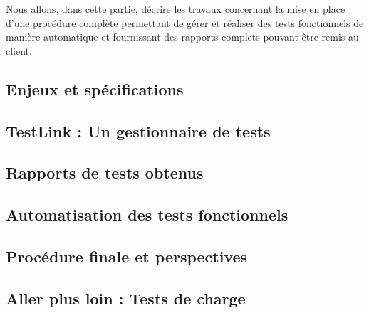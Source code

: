 	Nous allons, dans cette partie, décrire les travaux concernant la mise en place d'une procédure complète permettant de gérer et réaliser des tests fonctionnels de manière automatique et fournissant des rapports complets pouvant être remis au client.

\subsection{Enjeux et spécifications}
	
	\label{testsFonc_01}

\subsection{TestLink : Un gestionnaire de tests}
	
	\label{testsFonc_02}
	
\subsection{Rapports de tests obtenus}
	
	\label{testsFonc_03}

\subsection{Automatisation des tests fonctionnels}
	
	\label{testsFonc_04}
		
\subsection{Procédure finale et perspectives}
	
	\label{testsFonc_05}
	
\subsection{Aller plus loin : Tests de charge}
	
	\label{testsFonc_06}
